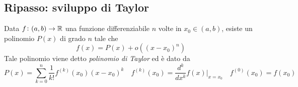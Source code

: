 \subsection{Ripasso: sviluppo di Taylor}
\begin{theorem}
    \label{th:6.5}
    Data $f\colon (a,b)\to \amsbb{R}$ una funzione differenziabile $n$ volte in $x_0\in(a,b)$, esiste un polinomio $P(x)$ di grado $n$ tale che
    \[
    f(x) = P(x)+o\left((x-x_0)^n\right)
    \]
    Tale polinomio viene detto \emph{polinomio di Taylor} ed è dato da
    \begin{equation}
        \label{eq:6.7}
        P(x) = \sum_{k=0}^n \frac{1}{k!} f^{(k)}(x_0) (x- x_0)^k \quad f^{(k)}(x_0) = \frac{d^k}{dx^k}f(x)\bigg|_{x=x_0} \quad f^{(0)}(x_0) = f(x_0)
    \end{equation}
\end{theorem}
